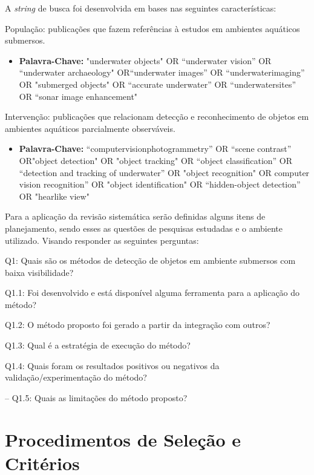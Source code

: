 A \textit{string} de busca foi desenvolvida em bases nas seguintes características:

População: publicações que fazem referências à estudos em ambientes aquáticos submersos.
\begin{itemize}
\item \textbf{Palavra-Chave:}
"underwater objects" OR “underwater vision” OR “underwater archaeology" OR“underwater images” OR “underwaterimaging” OR "submerged objects" OR “accurate underwater” OR “underwatersites” OR “sonar image enhancement"
\end{itemize}

Intervenção: publicações que relacionam detecção e reconhecimento de objetos em ambientes aquáticos parcialmente observáveis.
\begin{itemize}
\item \textbf{Palavra-Chave:}
“computervisionphotogrammetry” OR “scene contrast” OR"object detection" OR  "object tracking"  OR “object classification” OR “detection and tracking of underwater” OR "object recognition" OR computer vision recognition” OR "object identification" OR  “hidden-object detection” OR "hearlike view"
\end{itemize}

Para a aplicação da revisão sistemática serão definidas alguns itens de planejamento, sendo esses as questões de pesquisas estudadas e o ambiente utilizado. Visando responder as seguintes perguntas:

Q1: Quais são os métodos de detecção de objetos em ambiente submersos com baixa visibilidade? 

Q1.1: Foi desenvolvido e está disponível alguma ferramenta para a aplicação do método?

Q1.2: O método proposto foi gerado a partir da integração com outros?

Q1.3: Qual é a estratégia de execução do método?

Q1.4: Quais foram os resultados positivos ou negativos da validação/experimentação do método?

– Q1.5: Quais as limitações do método proposto?

\section{Procedimentos de Seleção e Critérios}

